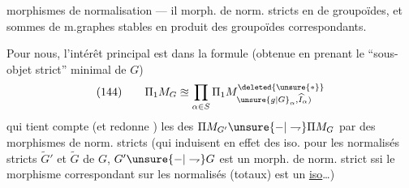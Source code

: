 morphismes de normalisation — il  morph. de norm. stricts en  de groupoïdes, et sommes de m.graphes stables en produit des groupoïdes correspondants.

Pour nous, l'intérêt principal est dans la formule (obtenue en prenant le ``sous-objet strict'' minimal de $G$)
\[
(144)\qquad \Pi_1M_G\approxeq\prod_{\alpha\in S}\Pi_1M_{\unsure{g|G}_\alpha,\widehat I_\alpha)}^{\deleted{\unsure{*}}}
\]
qui tient compte  (et redonne ) les  des $\Pi M_{G'}\unsure{-|\rightharpoondown}\Pi M_G$ par des morphismes de norm. stricts (qui induisent en effet des iso. pour les normalisés stricts $\widetilde G'$ et $\widetilde G$ de $G$,
$G'\unsure{-|\rightharpoondown}G$ est un morph. de norm. strict ssi le morphisme correspondant sur les normalisés (totaux) est un \uline{iso}\ldots)
